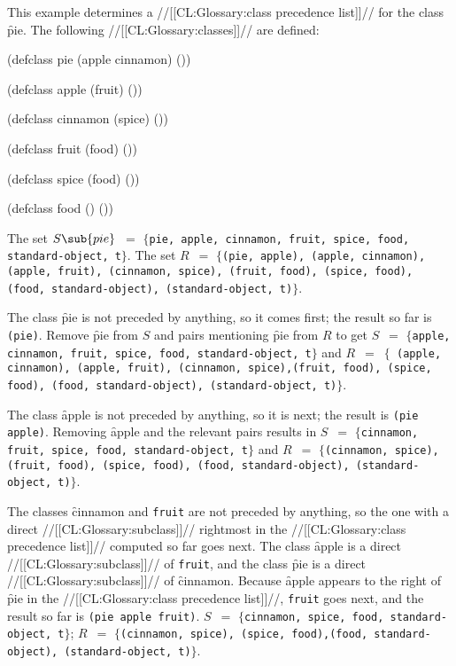 \endsubsubsection%


This example determines a //[[CL:Glossary:class precedence list]]// for the
class \f{pie}.  The following //[[CL:Glossary:classes]]// are defined:

\code
 (defclass pie (apple cinnamon) ())
 
 (defclass apple (fruit) ())
 
 (defclass cinnamon (spice) ())
 
 (defclass fruit (food) ())

 (defclass spice (food) ())

 (defclass food () ())
\endcode


The set $S\sub{pie}$~$=$ $\{${\tt pie, apple, cinnamon, fruit, spice, food,
standard-object, t}$\}$. The set $R$~$=$ $\{${\tt (pie, apple),
(apple, cinnamon), (apple, fruit), (cinnamon, spice), \hfil\break
(fruit, food), (spice, food), (food, standard-object), (standard-object,
t)}$\}$.

The class \f{pie} is not preceded by anything, so it comes first;
the result so far is {\tt (pie)}.  Remove \f{pie} from $S$ and pairs
mentioning \f{pie} from $R$ to get $S$~$=$ $\{${\tt apple, cinnamon,
fruit, spice, food, standard-object, t}$\}$ and $R$~$=$~$\{${\tt
(apple, cinnamon), (apple, fruit), (cinnamon, spice),\hfil\break (fruit,
food), (spice, food), (food, standard-object),
(standard-object, t)}$\}$.

The class \f{apple} is not preceded by anything, so it is next; the
result is {\tt (pie apple)}. Removing \f{apple} and the relevant
pairs results in $S$~$=$ $\{${\tt cinnamon, fruit, spice, food,
standard-object, t}$\}$ and $R$~$=$ $\{${\tt (cinnamon, spice),
(fruit, food), (spice, food), (food, standard-object),\hfil\break
(standard-object, t)}$\}$.

The classes \f{cinnamon} and {\tt fruit} are not preceded by
anything, so the one with a direct //[[CL:Glossary:subclass]]// rightmost in the 
//[[CL:Glossary:class precedence list]]// computed so far goes next.  The class \f{apple} is a
direct //[[CL:Glossary:subclass]]// of {\tt fruit}, and the class \f{pie} is a direct
//[[CL:Glossary:subclass]]// of \f{cinnamon}.  Because \f{apple} appears to the right
of \f{pie} in the //[[CL:Glossary:class precedence list]]//, 
{\tt fruit} goes next, and the
result so far is {\tt (pie apple fruit)}.  $S$~$=$ $\{${\tt cinnamon,
spice, food, standard-object, t}$\}$; $R$~$=$ $\{${\tt (cinnamon,
spice), (spice, food),\hfil\break (food, standard-object),
(standard-object, t)}$\}$.

